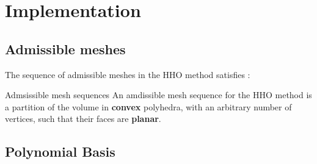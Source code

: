 \section{Implementation}

    \subsection{Admissible meshes}
    \label{sec_mesh}
        
        The sequence of admissible meshes in the HHO method satisfies :

        \begin{defbox}{Admsissible mesh sequences}
            An amdissible mesh sequence for the HHO method is a partition of the volume in \textbf{convex} polyhedra, with an arbitrary number of vertices, such that their faces are \textbf{planar}.
        \end{defbox}

    \subsection{Polynomial Basis}
        
